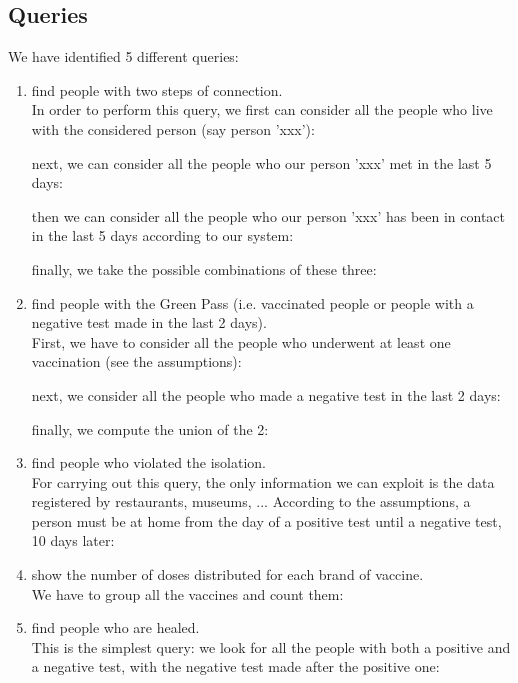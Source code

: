 \documentclass{article}
\begin{document}
\subsection{Queries}
We have identified 5 different queries:
\begin{enumerate}
    \item find people with two steps of connection. \\In order to perform this query, we first can consider all the people who live with the considered person (say person 'xxx'):
    
    next, we can consider all the people who our person 'xxx' met in the last 5 days:
    
    then we can consider all the people who our person 'xxx' has been in contact in the last 5 days according to our system:
    
    finally, we take the possible combinations of these three:
    
    \item find people with the Green Pass (i.e. vaccinated people or people with a negative test made in the last 2 days).\\ First, we have to consider all the people who underwent at least one vaccination (see the assumptions):
    
    next, we consider all the people who made a negative test in the last 2 days:
    
    finally, we compute the union of the 2:
    
    \item find people who violated the isolation.\\ For carrying out this query, the only information we can exploit is the data registered by restaurants, museums, ... According to the assumptions, a person must be at home from the day of a positive test until a negative test, 10 days later:
    
    \item show the number of doses distributed for each brand of vaccine.\\ We have to group all the vaccines and count them:
    
    \item find people who are healed. \\This is the simplest query: we look for all the people with both a positive and a negative test, with the negative test made after the positive one:
    
\end{enumerate}
\end{document}
